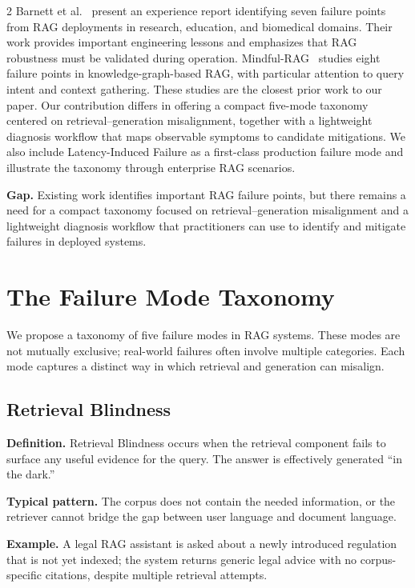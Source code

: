\documentclass[11pt,a4paper]{article}
\begin{document}
\begin{multicols}{2}
Barnett et al.~\cite{barnett2024seven} present an experience report identifying seven failure points from RAG deployments in research, education, and biomedical domains. Their work provides important engineering lessons and emphasizes that RAG robustness must be validated during operation. Mindful-RAG~\cite{agrawal2024mindful} studies eight failure points in knowledge-graph-based RAG, with particular attention to query intent and context gathering. These studies are the closest prior work to our paper. Our contribution differs in offering a compact five-mode taxonomy centered on retrieval--generation misalignment, together with a lightweight diagnosis workflow that maps observable symptoms to candidate mitigations. We also include Latency-Induced Failure as a first-class production failure mode and illustrate the taxonomy through enterprise RAG scenarios.

\textbf{Gap.} Existing work identifies important RAG failure points, but there remains a need for a compact taxonomy focused on retrieval--generation misalignment and a lightweight diagnosis workflow that practitioners can use to identify and mitigate failures in deployed systems.

\section{The Failure Mode Taxonomy}
\label{sec:taxonomy}

We propose a taxonomy of five failure modes in RAG systems. These modes are not mutually exclusive; real-world failures often involve multiple categories. Each mode captures a distinct way in which retrieval and generation can misalign.

\subsection{Retrieval Blindness}

\textbf{Definition.} Retrieval Blindness occurs when the retrieval component fails to surface any useful evidence for the query. The answer is effectively generated ``in the dark.''

\textbf{Typical pattern.} The corpus does not contain the needed information, or the retriever cannot bridge the gap between user language and document language.

\textbf{Example.} A legal RAG assistant is asked about a newly introduced regulation that is not yet indexed; the system returns generic legal advice with no corpus-specific citations, despite multiple retrieval attempts.


\end{multicols}
\end{document}
